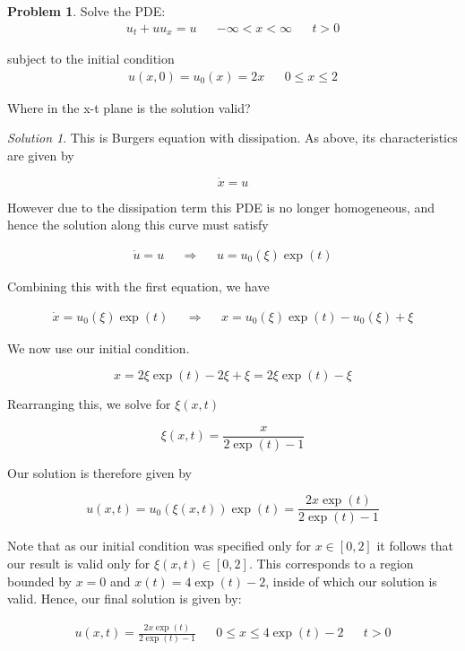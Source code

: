 \documentclass[12pt,a4paper]{article}
\theoremstyle{definition}
\newtheorem{problem}{Problem}
\theoremstyle{remark}
\newtheorem*{solution}{Solution}
\begin{document}
  \begin{problem}
    Solve the PDE:
    \begin{align*}
        u_t + uu_x = u && -\infty < x < \infty  && t>0
    \end{align*}

    subject to the initial condition 
    \begin{align*}
        u(x,0)=u_0(x)=2x && 0 \le x \le 2
    \end{align*}

    Where in the x-t plane is the solution valid?
  \end{problem}
  \begin{solution}
    This is Burgers equation with dissipation. As above, its characteristics are given by 
    
    $$\dot x = u$$

    However due to the dissipation term this PDE is no longer homogeneous, and hence the solution along this curve must satisfy 

    \begin{align*}
      \dot u = u && \Rightarrow && u= u_0(\xi)\exp(t)
    \end{align*}

    Combining this with the first equation, we have 

    \begin{align*}
      \dot x = u_0(\xi) \exp(t) && \Rightarrow && x = u_0(\xi)\exp(t) -u_0(\xi) + \xi
    \end{align*}

    We now use our initial condition.

    $$x = 2\xi \exp(t) - 2\xi + \xi = 2 \xi \exp(t)- \xi$$

    Rearranging this, we solve for $\xi(x,t)$ 

    $$\xi(x,t) = \frac{x}{2\exp(t) -1}$$

    Our solution is therefore given by 

    $$u(x,t) = u_0(\xi(x,t))\exp(t) = \frac{2x \exp(t)}{2\exp(t)-1}$$

    Note that as our initial condition was specified only for $x \in [0,2]$ it follows that our result is valid only for $\xi(x,t) \in [0,2]$. This corresponds to a region bounded by $x=0$ and $x(t) = 4 \exp(t) -2$, inside of which our solution is valid. Hence, our final solution is given by:

    \begin{align*}
      u(x,t) = \frac{2x \exp(t)}{2\exp(t)-1} && 0 \le x \le 4 \exp(t) -2 && t>0
    \end{align*}


\end{solution}
\end{document}
